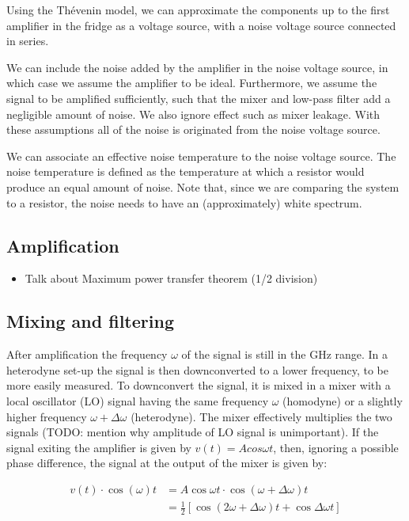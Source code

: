 \documentclass[12pt]{report}
\begin{document}
Using the Th\'evenin model, we can approximate the components up to the first amplifier in the fridge as a voltage source, with a noise voltage source connected in series.

We can include the noise added by the amplifier in the noise voltage source, in which case we assume the amplifier to be ideal. Furthermore, we assume the signal to be amplified sufficiently, such that the mixer and low-pass filter add a negligible amount of noise. We also ignore effect such as mixer leakage. With these assumptions all of the noise is originated from the noise voltage source.

We can associate an effective noise temperature to the noise voltage source. The noise temperature is defined as the temperature at which a resistor would produce an equal amount of noise. Note that, since we are comparing the system to a resistor, the noise needs to have an (approximately) white spectrum.




\subsection{Amplification}


\begin{itemize}
    \item Talk about Maximum power transfer theorem (1/2 division)
\end{itemize}

\subsection{Mixing and filtering}

After amplification the frequency $\omega$ of the signal is still in the GHz range. In a heterodyne set-up the signal is then downconverted to a lower frequency, to be more easily measured. To downconvert the signal, it is mixed in a mixer with a local oscillator (LO) signal having the same frequency $\omega$ (homodyne) or a slightly higher frequency $\omega + \Delta \omega$ (heterodyne). The mixer effectively multiplies the two signals (TODO: mention why amplitude of LO signal is unimportant). If the signal exiting the amplifier is given by $v(t) = A cos\omega t$, then, ignoring a possible phase difference, the signal at the output of the mixer is given by:

\begin{align}
    v(t) \cdot \cos{(\omega) t}& = A \cos{\omega t} \cdot \cos{(\omega + \Delta \omega ) t} \\
        & = \frac{1}{2}\left[\cos{(2\omega + \Delta \omega)t} + \cos{\Delta \omega t}\right]
        \label{eqn:mixer}
\end{align}
\end{document}
